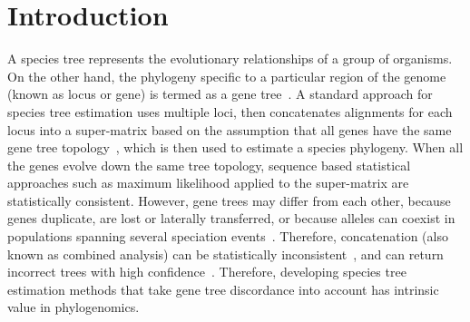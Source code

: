 \section{Introduction}
\label{sec:intro}
A species tree represents the evolutionary relationships of a group of organisms. On the other hand, the phylogeny specific to a particular region of the genome (known as locus or gene) is termed as a gene tree~\cite{maddison1997gene}. A standard approach for species tree estimation uses multiple loci, then concatenates alignments for each locus
into a super-matrix based on the assumption that all genes have the same gene tree topology~\cite{huelsenbeck1996combining, de2007supermatrix}, which is then used to estimate a species phylogeny. When all the genes evolve down the same tree topology,  sequence based statistical approaches such as maximum likelihood applied to the super-matrix are statistically consistent. 
However, gene trees may differ from each other, because genes duplicate, are lost or laterally transferred, or because alleles can coexist in populations spanning several speciation events~\cite{maddison1997gene}.
Therefore, concatenation (also known as combined analysis) can be statistically inconsistent~\cite{roch2015likelihood}, and can return incorrect trees with high confidence~\cite{kubatko-degnan-2007,edwards2007,leache-rannala,degiorgio2009}. Therefore, developing species tree estimation methods that take gene tree discordance into account has intrinsic value in phylogenomics.



